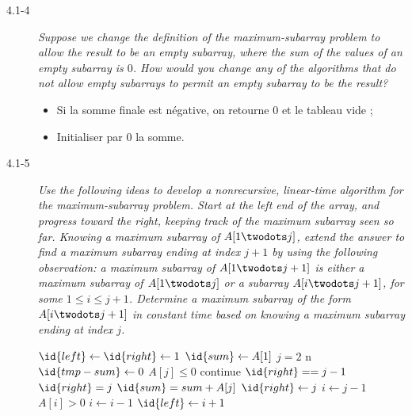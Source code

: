 \begin{description}
  \item[4.1-4] {\itshape Suppose we change the definition of the maximum-subarray problem to allow the result to be an empty subarray, where the sum of the values of an empty subarray is $0$. How would you change any of the algorithms that do not allow empty subarrays to permit an empty subarray to be the result?}

    \begin{ex} %
      \begin{itemize}
        \item Si la somme finale est n\'egative, on retourne $0$ et le tableau vide ;
        \item Initialiser par $0$ la somme.
      \end{itemize}
    \end{ex}

  \item[4.1-5] {\itshape Use the following ideas to develop a nonrecursive, linear-time algorithm for the maximum-subarray problem. Start at the left end of the array, and progress toward the right, keeping track of the maximum subarray seen so far. Knowing a maximum subarray of $A[1 \twodots j]$, extend the answer to find a maximum subarray ending at index $j+1$ by using the following observation: a maximum subarray of $A[1 \twodots j + 1]$ is either a maximum subarray of $A[1 \twodots j]$ or a subarray $A[i \twodots j + 1]$, for some $1 \le i \le j + 1$. Determine a maximum subarray of the form $A[i \twodots j + 1]$ in constant time based on knowing a maximum subarray ending at index $j$.}

    \begin{ex} %
      \begin{codebox}
        \li $\id{left} \gets \id{right} \gets 1$
        \li $\id{sum} \gets A[1]$
        \li \For $j = 2$ \To n \Do
        \li $\id{tmp-sum} \gets 0$
        \li \If $A[j] \le 0$ \Then
        \li continue
        \li \Else \If $\id{right} == j - 1$
        \li $\id{right} = j$
        \li $\id{sum} = sum + A[j]$
        \li \Else
        \li $\id{right} \gets j$
        \li $i \gets j - 1$
        \li \While $A[i] > 0$ \Then
        \li $i \gets i - 1$
        \li $\id{left} \gets i + 1$

      \end{codebox}
    \end{ex}

\end{description}

